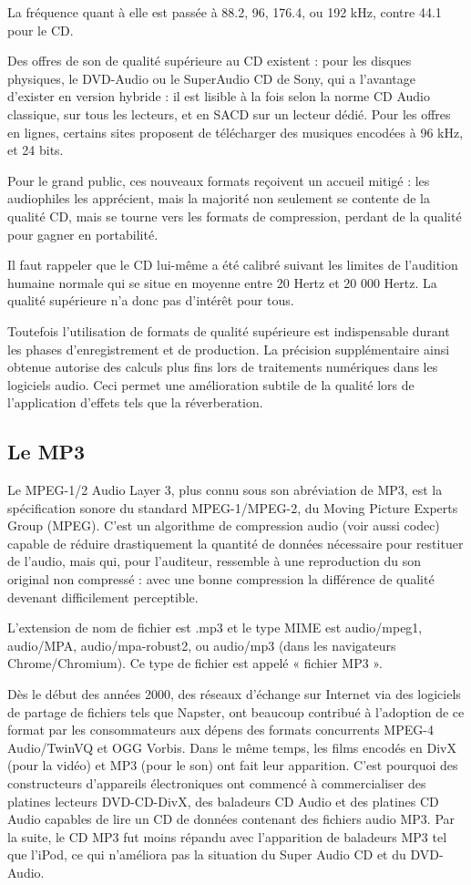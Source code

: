 \documentclass{report}
\begin{document}
La fréquence quant à elle est passée à 88.2, 96, 176.4, ou 192 kHz, contre 44.1 pour le CD.

Des offres de son de qualité supérieure au CD existent : pour les disques physiques, le DVD-Audio ou le SuperAudio CD de Sony, qui a l'avantage d'exister en version hybride : il est lisible à la fois selon la norme CD Audio classique, sur tous les lecteurs, et en SACD sur un lecteur dédié. Pour les offres en lignes, certains sites proposent de télécharger des musiques encodées à 96 kHz, et 24 bits.

Pour le grand public, ces nouveaux formats reçoivent un accueil mitigé : les audiophiles les apprécient, mais la majorité non seulement se contente de la qualité CD, mais se tourne vers les formats de compression, perdant de la qualité pour gagner en portabilité.

Il faut rappeler que le CD lui-même a été calibré suivant les limites de l'audition humaine normale qui se situe en moyenne entre 20 Hertz et 20 000 Hertz. La qualité supérieure n'a donc pas d'intérêt pour tous.

Toutefois l'utilisation de formats de qualité supérieure est indispensable durant les phases d'enregistrement et de production. La précision supplémentaire ainsi obtenue autorise des calculs plus fins lors de traitements numériques dans les logiciels audio. Ceci permet une amélioration subtile de la qualité lors de l'application d'effets tels que la réverberation.

\subsection{Le MP3}

Le MPEG-1/2 Audio Layer 3, plus connu sous son abréviation de MP3, est la spécification sonore du standard MPEG-1/MPEG-2, du Moving Picture Experts Group (MPEG). C'est un algorithme de compression audio (voir aussi codec) capable de réduire drastiquement la quantité de données nécessaire pour restituer de l'audio, mais qui, pour l'auditeur, ressemble à une reproduction du son original non compressé : avec une bonne compression la différence de qualité devenant difficilement perceptible.

L'extension de nom de fichier est .mp3 et le type MIME est audio/mpeg1, audio/MPA, audio/mpa-robust2, ou audio/mp3 (dans les navigateurs Chrome/Chromium). Ce type de fichier est appelé « fichier MP3 ».

Dès le début des années 2000, des réseaux d'échange sur Internet via des logiciels de partage de fichiers tels que Napster, ont beaucoup contribué à l'adoption de ce format par les consommateurs aux dépens des formats concurrents MPEG-4 Audio/TwinVQ et OGG Vorbis. Dans le même temps, les films encodés en DivX (pour la vidéo) et MP3 (pour le son) ont fait leur apparition. C'est pourquoi des constructeurs d'appareils électroniques ont commencé à commercialiser des platines lecteurs DVD-CD-DivX, des baladeurs CD Audio et des platines CD Audio capables de lire un CD de données contenant des fichiers audio MP3. Par la suite, le CD MP3 fut moins répandu avec l'apparition de baladeurs MP3 tel que l'iPod, ce qui n'améliora pas la situation du Super Audio CD et du DVD-Audio.
\end{document}
